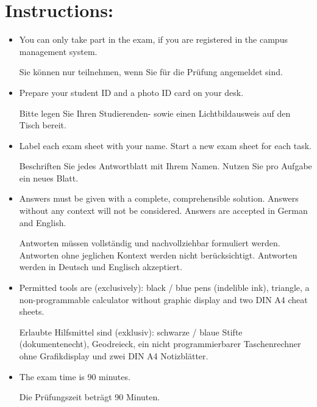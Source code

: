 \section*{\hspace*{2mm}Instructions:}
\begin{itemize}
\item You can only take part in the exam, if you are registered in the campus management system.

\begin{germanblock}
    Sie können nur teilnehmen, wenn Sie für die Prüfung angemeldet sind.
\end{germanblock}
\item Prepare your student ID and a photo ID card on your desk.

\begin{germanblock}
    Bitte legen Sie Ihren Studierenden- sowie einen Lichtbildausweis auf den Tisch bereit.
\end{germanblock}
\item Label each exam sheet with your name. Start a new exam sheet for each task. 

\begin{germanblock}
    Beschriften Sie jedes Antwortblatt mit Ihrem Namen. Nutzen Sie pro  Aufgabe ein neues Blatt.
\end{germanblock}
\item Answers must be given with a complete, comprehensible solution. Answers without any context will not be considered. Answers are accepted in German and English.

\begin{germanblock}
    Antworten müssen vollständig und nachvollziehbar formuliert werden. Antworten ohne jeglichen Kontext werden nicht berücksichtigt. Antworten werden in Deutsch und Englisch akzeptiert.
\end{germanblock}
\item Permitted tools are (exclusively): black / blue pens (indelible ink), triangle, a non-programmable calculator without graphic display and two DIN A4 cheat sheets.

\begin{germanblock}
    Erlaubte Hilfsmittel sind (exklusiv): schwarze / blaue Stifte (dokumentenecht), Geodreieck, ein nicht programmierbarer Taschenrechner ohne Grafikdisplay und zwei DIN A4 Notizblätter.
\end{germanblock}
\item The exam time is 90 minutes.

\begin{germanblock}
    Die Prüfungszeit beträgt 90 Minuten.
\end{germanblock} 
\end{itemize}

